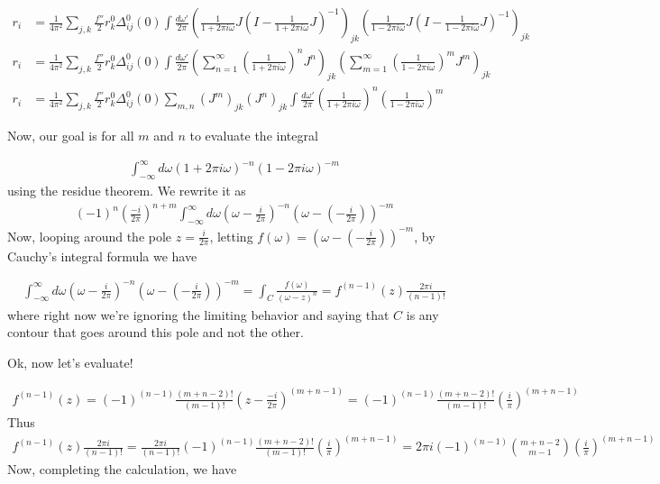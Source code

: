 \documentclass [12pt]{amsart}
\theoremstyle{definition}
\newcommand{\inv}{^{-1}}
\begin{document}
\begin{align*}
r_i &=  \frac{1}{4\pi^2}\sum_{j,k} \frac{f''}{2} r_k^0\Delta_{ij}^0(0)\int \frac{d\omega'}{2\pi} \left(\frac{1}{1 + 2\pi  i \omega}J(I - \frac{1}{1 + 2\pi  i \omega} J)\inv\right)_{jk}\left(\frac{1}{1 -2\pi  i \omega}J(I - \frac{1}{1 - 2\pi  i \omega} J)\inv\right)_{jk}\\
r_i &=  \frac{1}{4\pi^2}\sum_{j,k} \frac{f''}{2} r_k^0\Delta_{ij}^0(0)\int \frac{d\omega'}{2\pi} \left(\sum_{n =1}^\infty \left(\frac{1}{1 + 2\pi  i \omega}\right)^n J^n\right)_{jk}\left(\sum_{m =1}^\infty \left(\frac{1}{1 - 2\pi  i \omega}\right)^m J^m \right)_{jk}\\
r_i &=  \frac{1}{4\pi^2}\sum_{j,k} \frac{f''}{2} r_k^0\Delta_{ij}^0(0)\sum_{m, n} (J^{m})_{jk} (J^n)_{jk}\int \frac{d\omega'}{2\pi} \left(\frac{1}{1 + 2\pi  i \omega}\right)^n \left(\frac{1}{1 - 2\pi  i \omega}\right)^m 
\end{align*}

Now, our goal is for all $m$ and $n$ to evaluate the integral 

\begin{align*}
\int_{-\infty}^\infty d\omega (1 + 2\pi i \omega)^{-n} (1 - 2\pi i \omega)^{-m}
\end{align*} 
using the residue theorem. We rewrite it as 
\begin{align*}
 (-1)^n\left(\frac{-i}{2\pi}\right)^{n+m} \int_{-\infty}^\infty d\omega\left(\omega - \frac{i}{2\pi}\right)^{-n} \left(\omega - (- \frac{i}{2\pi})\right)^{-m}
\end{align*} 
Now, looping around the pole $z = \frac{i}{2\pi}$, letting $f(\omega) = \left(\omega - (- \frac{i}{2\pi})\right)^{-m}$,   by Cauchy’s integral formula we have 



\begin{align*}
 \int_{-\infty}^\infty d\omega\left(\omega - \frac{i}{2\pi}\right)^{-n} \left(\omega - (- \frac{i}{2\pi})\right)^{-m} = \int_C \frac{f(\omega)}{(\omega -z)^n} = f^{(n-1)}(z) \frac{2\pi i}{(n-1)!} 
\end{align*}
where right now we're ignoring the limiting behavior and saying that $C$ is any contour that goes around this pole and not the other. 

Ok, now let's evaluate! 

\begin{align*}
f^{(n-1)}(z) = (-1)^{(n-1)} \frac{(m + n - 2)!}{(m -1)!}\left(z- \frac{-i}{2\pi}\right)^{(m +n -1)} =  (-1)^{(n-1)} \frac{(m + n - 2)!}{(m -1)!} \left(\frac{i}{\pi}\right)^{(m +n -1)}
\end{align*}
Thus 
\begin{align*}
f^{(n-1)}(z) \frac{2\pi i}{(n-1)!}  =   \frac{2\pi i}{(n-1)!} (-1)^{(n-1)} \frac{(m + n - 2)!}{(m -1)!} \left(\frac{i}{\pi}\right)^{(m +n -1)} = 2\pi i (-1)^{(n-1)}\binom{m + n -2}{m-1} \left(\frac{i}{\pi}\right)^{(m +n -1)}
\end{align*}
Now, completing the calculation, we have 
\end{document}
